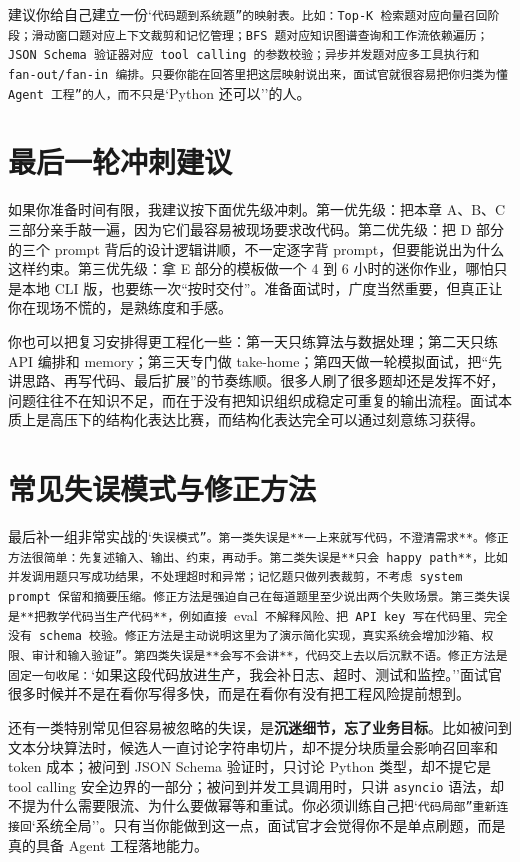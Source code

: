 建议你给自己建立一份`\texttt{代码题到系统题''的映射表。比如：Top-K 检索题对应向量召回阶段；滑动窗口题对应上下文裁剪和记忆管理；BFS 题对应知识图谱查询和工作流依赖遍历；JSON Schema 验证器对应 tool calling 的参数校验；异步并发题对应多工具执行和 fan-out/fan-in 编排。只要你能在回答里把这层映射说出来，面试官就很容易把你归类为}\texttt{懂 Agent 工程''的人，而不只是}`Python 还可以''的人。


\section{最后一轮冲刺建议}

如果你准备时间有限，我建议按下面优先级冲刺。第一优先级：把本章 A、B、C 三部分亲手敲一遍，因为它们最容易被现场要求改代码。第二优先级：把 D 部分的三个 prompt 背后的设计逻辑讲顺，不一定逐字背 prompt，但要能说出为什么这样约束。第三优先级：拿 E 部分的模板做一个 4 到 6 小时的迷你作业，哪怕只是本地 CLI 版，也要练一次``按时交付''。准备面试时，广度当然重要，但真正让你在现场不慌的，是熟练度和手感。


你也可以把复习安排得更工程化一些：第一天只练算法与数据处理；第二天只练 API 编排和 memory；第三天专门做 take-home；第四天做一轮模拟面试，把``先讲思路、再写代码、最后扩展''的节奏练顺。很多人刷了很多题却还是发挥不好，问题往往不在知识不足，而在于没有把知识组织成稳定可重复的输出流程。面试本质上是高压下的结构化表达比赛，而结构化表达完全可以通过刻意练习获得。


\section{常见失误模式与修正方法}

最后补一组非常实战的`\texttt{失误模式''。第一类失误是**一上来就写代码，不澄清需求**。修正方法很简单：先复述输入、输出、约束，再动手。第二类失误是**只会 happy path**，比如并发调用题只写成功结果，不处理超时和异常；记忆题只做列表裁剪，不考虑 system prompt 保留和摘要压缩。修正方法是强迫自己在每道题里至少说出两个失败场景。第三类失误是**把教学代码当生产代码**，例如直接 }eval\texttt{ 不解释风险、把 API key 写在代码里、完全没有 schema 校验。修正方法是主动说明}\texttt{这里为了演示简化实现，真实系统会增加沙箱、权限、审计和输入验证''。第四类失误是**会写不会讲**，代码交上去以后沉默不语。修正方法是固定一句收尾：}`如果这段代码放进生产，我会补日志、超时、测试和监控。''面试官很多时候并不是在看你写得多快，而是在看你有没有把工程风险提前想到。


还有一类特别常见但容易被忽略的失误，是\textbf{沉迷细节，忘了业务目标}。比如被问到文本分块算法时，候选人一直讨论字符串切片，却不提分块质量会影响召回率和 token 成本；被问到 JSON Schema 验证时，只讨论 Python 类型，却不提它是 tool calling 安全边界的一部分；被问到并发工具调用时，只讲 \texttt{asyncio} 语法，却不提为什么需要限流、为什么要做幂等和重试。你必须训练自己把`\texttt{代码局部''重新连接回}`系统全局''。只有当你能做到这一点，面试官才会觉得你不是单点刷题，而是真的具备 Agent 工程落地能力。


